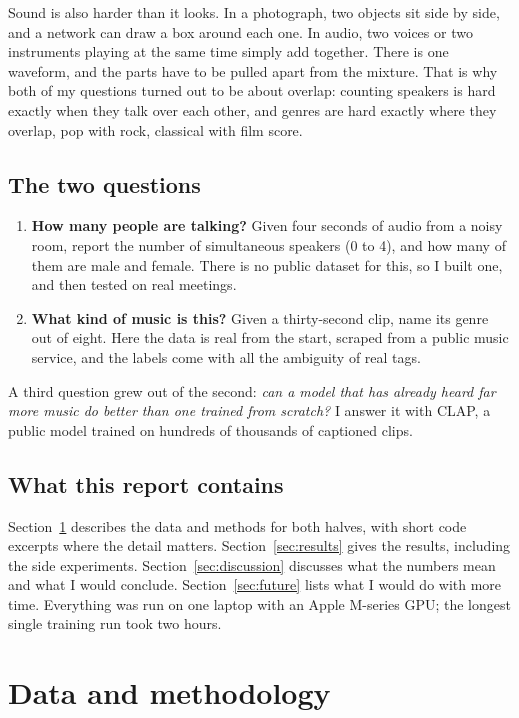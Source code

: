 \documentclass[11pt]{article}
\begin{document}
Sound is also harder than it looks. In a photograph, two objects sit side by side, and a network can draw a box around each one. In audio, two voices or two instruments playing at the same time simply add together. There is one waveform, and the parts have to be pulled apart from the mixture. That is why both of my questions turned out to be about overlap: counting speakers is hard exactly when they talk over each other, and genres are hard exactly where they overlap, pop with rock, classical with film score.

\subsection{The two questions}
\begin{enumerate}
  \item \textbf{How many people are talking?} Given four seconds of audio from a noisy room, report the number of simultaneous speakers (0 to 4), and how many of them are male and female. There is no public dataset for this, so I built one, and then tested on real meetings.
  \item \textbf{What kind of music is this?} Given a thirty-second clip, name its genre out of eight. Here the data is real from the start, scraped from a public music service, and the labels come with all the ambiguity of real tags.
\end{enumerate}
A third question grew out of the second: \emph{can a model that has already heard far more music do better than one trained from scratch?} I answer it with CLAP, a public model trained on hundreds of thousands of captioned clips.

\subsection{What this report contains}
Section~\ref{sec:method} describes the data and methods for both halves, with short code excerpts where the detail matters. Section~\ref{sec:results} gives the results, including the side experiments. Section~\ref{sec:discussion} discusses what the numbers mean and what I would conclude. Section~\ref{sec:future} lists what I would do with more time. Everything was run on one laptop with an Apple M-series GPU; the longest single training run took two hours.

\section{Data and methodology}\label{sec:method}
\end{document}

